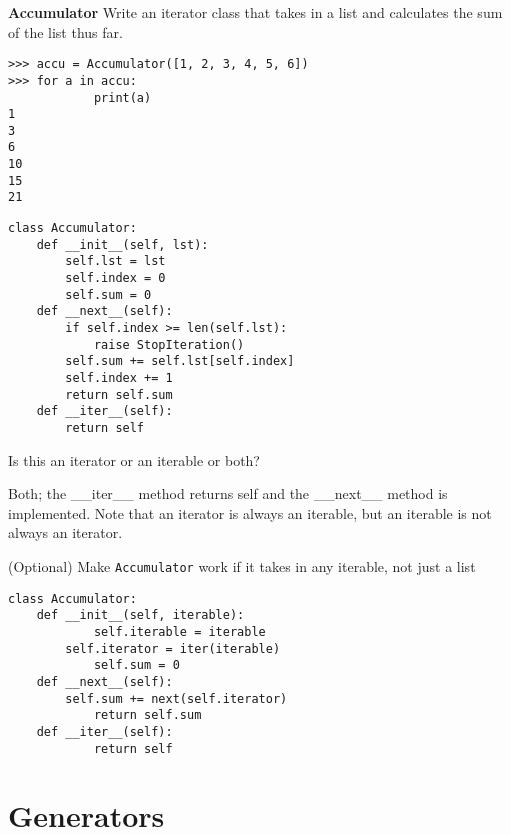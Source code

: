 \documentclass{exam}
\begin{document}
\begin{questions}
\begin{blocksection}
\question \textbf{Accumulator} Write an iterator class that takes in a list and calculates the sum of the list thus far.
\begin{lstlisting}
>>> accu = Accumulator([1, 2, 3, 4, 5, 6])
>>> for a in accu:
            print(a)
1
3
6
10
15
21
\end{lstlisting}
\end{blocksection}

\begin{solution}
\begin{lstlisting}
class Accumulator:
	def __init__(self, lst):
		self.lst = lst
		self.index = 0
		self.sum = 0
	def __next__(self):
		if self.index >= len(self.lst):
			raise StopIteration()
		self.sum += self.lst[self.index]
		self.index += 1
		return self.sum
	def __iter__(self):
		return self
\end{lstlisting}
\end{solution}

\question Is this an iterator or an iterable or both?
\begin{solution}
Both; the __iter__ method returns self and the __next__ method is implemented. Note that an iterator is always an iterable, but an iterable is not always an iterator.
\end{solution}

\question (Optional) Make \texttt{Accumulator} work if it takes in any iterable, not just a list

\begin{solution}
\begin{lstlisting}
class Accumulator:
	def __init__(self, iterable):
    		self.iterable = iterable
		self.iterator = iter(iterable)
            self.sum = 0
	def __next__(self):
    	self.sum += next(self.iterator)
    		return self.sum
	def __iter__(self):
    		return self
\end{lstlisting}
\end{solution}

\section{Generators}

\end{questions}
\end{document}
